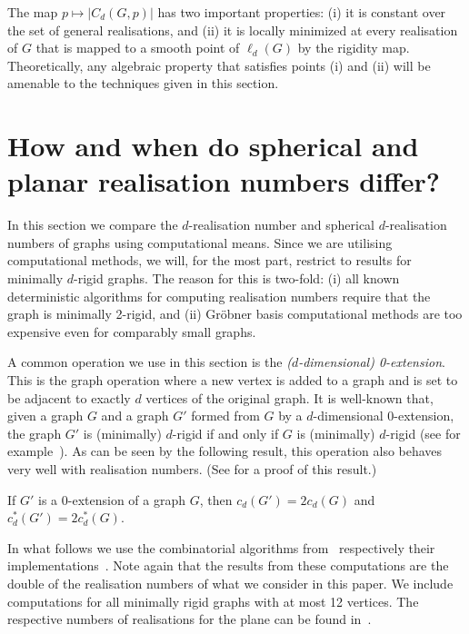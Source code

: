 \documentclass[ALCO]{cedram}
\begin{document}
\begin{remark}\label{rem:alginfo}
	The map $p \mapsto |C_d(G,p)|$ has two important properties:
	(i) it is constant over the set of general realisations,
	and (ii) it is locally minimized at every realisation of $G$ that is mapped to a smooth point of $\ell_d(G)$ by the rigidity map.
	Theoretically,
	any algebraic property that satisfies points (i) and (ii) will be amenable to the techniques given in this section.
\end{remark}




\section{How and when do spherical and planar realisation numbers differ?}\label{sec:compute}

In this section we compare the $d$-realisation number and spherical $d$-realisation numbers of graphs using computational means.
Since we are utilising computational methods,
we will, for the most part, restrict to results for minimally $d$-rigid graphs.
The reason for this is two-fold:
(i) all known deterministic algorithms for computing realisation numbers require that the graph is minimally 2-rigid,
and (ii) Gr\"{o}bner basis computational methods are too expensive even for comparably small graphs.

A common operation we use in this section is the \emph{($d$-dimensional) 0-extension}.
This is the graph operation where a new vertex is added to a graph and is set to be adjacent to exactly $d$ vertices of the original graph.
It is well-known that, given a graph $G$ and a graph $G'$ formed from $G$ by a $d$-dimensional 0-extension, the graph $G'$ is (minimally) $d$-rigid if and only if $G$ is (minimally) $d$-rigid (see for example~\cite[Proposition 5.1]{TayWhite85}).
As can be seen by the following result,
this operation also behaves very well with realisation numbers.
(See  for a proof of this result.)

\begin{lemma}\label{l:0ext}
	If $G'$ is a 0-extension of a graph $G$,
	then $c_d(G') = 2c_d(G)$ and $c_d^*(G') = 2c^*_d(G)$.
\end{lemma}


In what follows we use the combinatorial algorithms from~\cite{PlaneCount,SphereCount} respectively their implementations~\cite{ZenodoAlg,SphereAlg,RigiComp}.
Note again that the results from these computations are the double of the realisation numbers of what we consider in this paper.
We include computations for all minimally rigid graphs with at most 12 vertices. The respective numbers of realisations for the plane can be found in~\cite{ZenodoData}.
\end{document}
